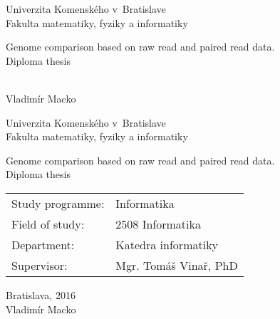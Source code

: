 \documentclass[12pt, oneside]{book}
\def\mfrok{2016}
\def\mfnazov{Genome comparison based on raw read and paired read data.}
\def\mftyp{Diploma thesis}
\def\mfautor{Vladimír Macko}
\def\mfskolitel{Mgr. Tomáš Vinař, PhD}
\def\mfmiesto{Bratislava, \mfrok}
\def\mfodbor{2508 Informatika}
\def\program{ Informatika }
\def\mfpracovisko{ Katedra informatiky }
\begin{document}
     

\thispagestyle{empty}

\begin{center}
\sc\large
Univerzita Komenského v~Bratislave\\
Fakulta matematiky, fyziky a informatiky

\vfill

{\LARGE\mfnazov}\\
\mftyp
\end{center}

\vfill

{\sc\large 
\noindent \mfrok\\
\mfautor
}

\eject %


\thispagestyle{empty}
\noindent

\begin{center}
\sc  
\large
Univerzita Komenského v~Bratislave\\
Fakulta matematiky, fyziky a informatiky

\vfill

{\LARGE\mfnazov}\\
\mftyp
\end{center}

\vfill

\noindent
\begin{tabular}{ll}
Study programme: & \program \\
Field of study: & \mfodbor \\
Department: & \mfpracovisko \\
Supervisor: & \mfskolitel \\
\end{tabular}

\vfill


\noindent \mfmiesto\\
\mfautor

\eject %





\newpage 
\thispagestyle{empty}
\end{document}
